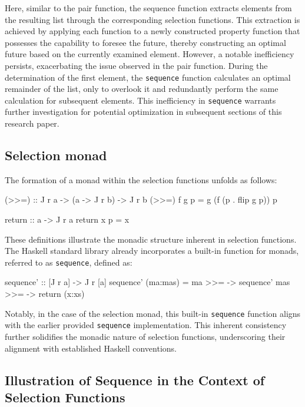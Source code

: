 \documentclass[runningheads]{llncs}
\begin{document}
Here, similar to the pair function, the sequence function extracts
elements from the resulting list through the corresponding selection
functions. This extraction is achieved by applying each function to a
newly constructed property function that possesses the capability to
foresee the future, thereby constructing an optimal future based on the
currently examined element. However, a notable inefficiency persists,
exacerbating the issue observed in the pair function. During the
determination of the first element, the \texttt{sequence} function
calculates an optimal remainder of the list, only to overlook it and
redundantly perform the same calculation for subsequent elements. This
inefficiency in \texttt{sequence} warrants further investigation for
potential optimization in subsequent sections of this research paper.

\subsection{Selection monad}\label{selection-monad}

The formation of a monad within the selection functions unfolds as
follows:

\begin{code}
(>>=) :: J r a -> (a -> J r b) -> J r b
(>>=) f g p = g (f (p . flip g p)) p
\end{code}

\begin{code}
return :: a -> J r a
return x p = x
\end{code}

These definitions illustrate the monadic structure inherent in selection
functions. The Haskell standard library already incorporates a built-in
function for monads, referred to as \texttt{sequence\textquotesingle{}},
defined as:

\begin{code}
sequence' :: [J r a] -> J r [a]
sequence' (ma:mas) = ma >>= 
                    \x -> sequence' mas >>= 
                    \xs -> return (x:xs)
\end{code}

Notably, in the case of the selection monad, this built-in
\texttt{sequence\textquotesingle{}} function aligns with the earlier
provided \texttt{sequence} implementation. This inherent consistency
further solidifies the monadic nature of selection functions,
underscoring their alignment with established Haskell conventions.

\subsection{Illustration of Sequence in the Context of Selection
Functions}\label{illustration-of-sequence-in-the-context-of-selection-functions}
\end{document}
